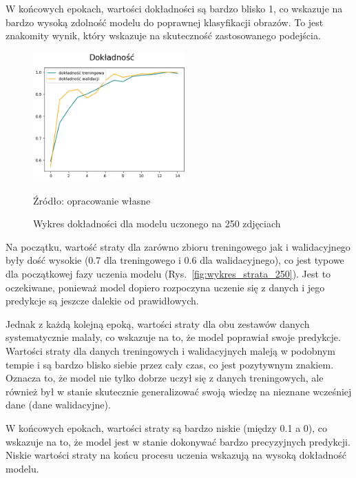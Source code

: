 W końcowych epokach, wartości dokładności są bardzo blisko 1, co wskazuje na bardzo wysoką zdolność modelu do poprawnej klasyfikacji obrazów. To jest znakomity wynik, który wskazuje na skuteczność zastosowanego podejścia.

\begin{figure}[htbp]
  \centering
  \caption{Wykres dokładności dla modelu uczonego na 250 zdjęciach}
  \includegraphics[width=220px]{images/dokladnosc_250.png}
  \begin{center}
  \footnotesize{Źródło: opracowanie własne}
  \end{center}
  \label{fig:wykres_dokladnosc_250}
\end{figure}

Na początku, wartość straty dla zarówno zbioru treningowego jak i walidacyjnego były dość wysokie (0.7 dla treningowego i 0.6 dla walidacyjnego), co jest typowe dla początkowej fazy uczenia modelu (Rys.~\ref{fig:wykres_strata_250}). Jest to oczekiwane, ponieważ model dopiero rozpoczyna uczenie się z danych i jego predykcje są jeszcze dalekie od prawidłowych.

Jednak z każdą kolejną epoką, wartości straty dla obu zestawów danych systematycznie malały, co wskazuje na to, że model poprawiał swoje predykcje. Wartości straty dla danych treningowych i walidacyjnych maleją w podobnym tempie i są bardzo blisko siebie przez cały czas, co jest pozytywnym znakiem. Oznacza to, że model nie tylko dobrze uczył się z danych treningowych, ale również był w stanie skutecznie generalizować swoją wiedzę na nieznane wcześniej dane (dane walidacyjne).

W końcowych epokach, wartości straty są bardzo niskie (między 0.1 a 0), co wskazuje na to, że model jest w stanie dokonywać bardzo precyzyjnych predykcji. Niskie wartości straty na końcu procesu uczenia wskazują na wysoką dokładność modelu.

